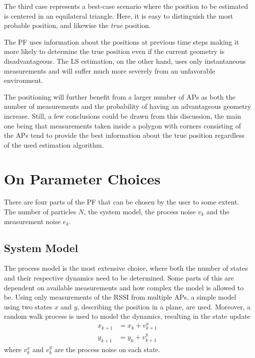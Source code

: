 \documentclass{LTHthesis}
\begin{document}
The third case represents a best-case scenario where the position to be estimated is centered in an equilateral triangle. Here, it is easy to distinguish the most probable position, and likewise the \emph{true} position.

The PF uses information about the positions at previous time steps making it more likely to determine the true position even if the current geometry is disadvantageous. The LS estimation, on the other hand, uses only instantaneous measurements and will suffer much more severely from an unfavorable environment. 
 
The positioning will further benefit from a larger number of APs as both the number of measurements and the probability of having an advantageous geometry increase. Still, a few conclusions could be drawn from this discussion, the main one being that measurements taken inside a polygon with corners consisting of the APs tend to provide the best information about the true position regardless of the used estimation algorithm. 
%
\section{On Parameter Choices}
%
There are four parts of the PF that can be chosen by the user to some extent. The number of particles $N$, the system model, the process noise $v_k$ and the measurement noise $e_k$.
%
\subsection{System Model}
%
The process model is the most extensive choice, where both the number of states and their respective dynamics need to be determined. Some parts of this are dependent on available measurements and how complex the model is allowed to be. Using only measurements of the RSSI from multiple APs, a simple model using two states $x$ and $y$, describing the position in a plane, are used. Moreover, a random walk process is used to model the dynamics, resulting in the state update
%
\begin{eqnarray}
x_{k+1}&=x_k + v^x_{k+1} \\
y_{k+1}&=y_k + v^y_{k+1} 
\end{eqnarray}
%
where $v^x_k$ and $v^y_k$ are the process noise on each state. 
%
\end{document}
